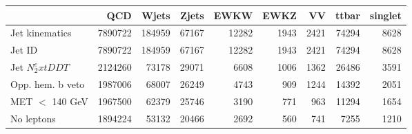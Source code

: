 \begin{tabular}{lrrrrrrrr}
\toprule
 & QCD & Wjets & Zjets & EWKW & EWKZ & VV & ttbar & singlet \\
\midrule
Jet kinematics & 7890722 & 184959 & 67167 & 12282 & 1943 & 2421 & 74294 & 8628 \\
Jet ID & 7890722 & 184959 & 67167 & 12282 & 1943 & 2421 & 74294 & 8628 \\
Jet $N_2^	ext{DDT}$ & 2124260 & 73178 & 29071 & 6608 & 1006 & 1362 & 26486 & 3591 \\
Opp. hem. b veto & 1987006 & 68007 & 26249 & 4743 & 909 & 1244 & 14392 & 2051 \\
MET $<$ 140 GeV & 1967500 & 62379 & 25746 & 3190 & 771 & 963 & 11294 & 1654 \\
No leptons & 1894224 & 53132 & 20466 & 2692 & 560 & 741 & 7255 & 1210 \\
\bottomrule
\end{tabular}
